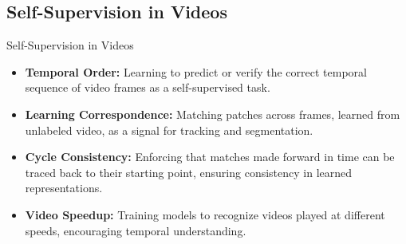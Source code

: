\subsection{Self-Supervision in Videos}
\begin{frame}[allowframebreaks]{Self-Supervision in Videos}
    \begin{itemize}
        \item \textbf{Temporal Order:} Learning to predict or verify the correct temporal sequence of video frames as a self-supervised task.
        \item \textbf{Learning Correspondence:} Matching patches across frames, learned from unlabeled video, as a signal for tracking and segmentation.
        \item \textbf{Cycle Consistency:} Enforcing that matches made forward in time can be traced back to their starting point, ensuring consistency in learned representations.
        \item \textbf{Video Speedup:} Training models to recognize videos played at different speeds, encouraging temporal understanding.
    \end{itemize}
\end{frame}